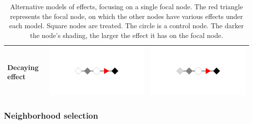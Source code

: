 \documentclass[12pt]{article}
\begin{document}
\begin{table}[h]
\begin{tabular}{|>{\centering\arraybackslash}m{2.75cm}|>{\centering\arraybackslash}m{5.5cm}|>{\centering\arraybackslash}m{5.5cm}|}
Decaying effect &  \includegraphics[scale=.225,clip=true,trim = 13cm 10cm 13cm 10cm]{./images/effect_decay_twohops} &  \includegraphics[scale=.225,clip=true,trim = 13cm 10cm 13cm 10cm]{./images/effect_decay_threehops} \\
\hline 
\end{tabular}

\caption{Alternative models of effects, focusing on a single focal node. The red triangle represents the focal node, on which the other nodes have various effects under each model. Square nodes are treated. The circle is a control node. The darker the node's shading, the larger the effect it has on the focal node.}
\label{tab:fourmodels}
\end{table}

\subsubsection{Neighborhood selection}
\end{document}

